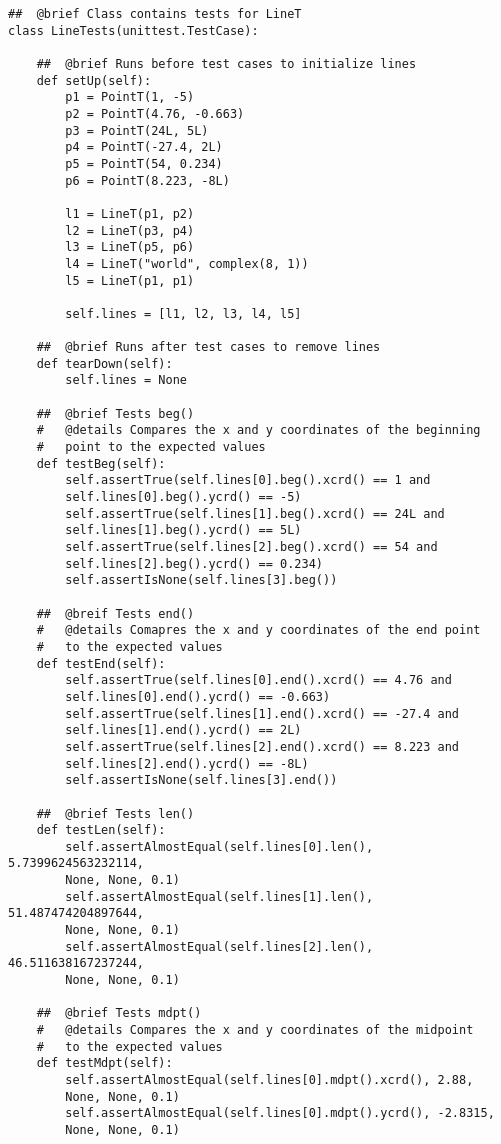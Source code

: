 \documentclass{article}
\begin{document}
\begin{lstlisting}
##  @brief Class contains tests for LineT
class LineTests(unittest.TestCase):
    
    ##  @brief Runs before test cases to initialize lines
    def setUp(self):
        p1 = PointT(1, -5)
        p2 = PointT(4.76, -0.663)
        p3 = PointT(24L, 5L)
        p4 = PointT(-27.4, 2L)
        p5 = PointT(54, 0.234)
        p6 = PointT(8.223, -8L)

        l1 = LineT(p1, p2)
        l2 = LineT(p3, p4)
        l3 = LineT(p5, p6)
        l4 = LineT("world", complex(8, 1))
        l5 = LineT(p1, p1)

        self.lines = [l1, l2, l3, l4, l5]

    ##  @brief Runs after test cases to remove lines
    def tearDown(self):
        self.lines = None
    
    ##  @brief Tests beg()
    #   @details Compares the x and y coordinates of the beginning 
    #   point to the expected values
    def testBeg(self):
        self.assertTrue(self.lines[0].beg().xcrd() == 1 and 
        self.lines[0].beg().ycrd() == -5)
        self.assertTrue(self.lines[1].beg().xcrd() == 24L and 
        self.lines[1].beg().ycrd() == 5L)
        self.assertTrue(self.lines[2].beg().xcrd() == 54 and 
        self.lines[2].beg().ycrd() == 0.234)
        self.assertIsNone(self.lines[3].beg())
       
    ##  @breif Tests end()
    #   @details Comapres the x and y coordinates of the end point 
    #   to the expected values
    def testEnd(self):
        self.assertTrue(self.lines[0].end().xcrd() == 4.76 and
        self.lines[0].end().ycrd() == -0.663)
        self.assertTrue(self.lines[1].end().xcrd() == -27.4 and
        self.lines[1].end().ycrd() == 2L)
        self.assertTrue(self.lines[2].end().xcrd() == 8.223 and
        self.lines[2].end().ycrd() == -8L)
        self.assertIsNone(self.lines[3].end())
       
    ##  @brief Tests len()
    def testLen(self):
        self.assertAlmostEqual(self.lines[0].len(), 5.7399624563232114,
        None, None, 0.1)
        self.assertAlmostEqual(self.lines[1].len(), 51.487474204897644,
        None, None, 0.1)
        self.assertAlmostEqual(self.lines[2].len(), 46.511638167237244,
        None, None, 0.1)
        
    ##  @brief Tests mdpt()
    #   @details Compares the x and y coordinates of the midpoint 
    #   to the expected values
    def testMdpt(self):
        self.assertAlmostEqual(self.lines[0].mdpt().xcrd(), 2.88,
        None, None, 0.1)
        self.assertAlmostEqual(self.lines[0].mdpt().ycrd(), -2.8315,
        None, None, 0.1)


\end{lstlisting}
\end{document}
